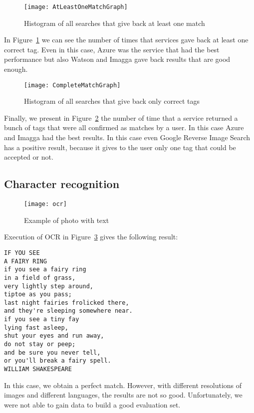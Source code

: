 \begin{figure}[H]
\centering
\texttt{[image: AtLeastOneMatchGraph]}
\caption{Histogram of all searches that give back at least one match}
\label{img:testatleastone}
\end{figure}

In Figure~\ref{img:testatleastone} we can see the number of times that services gave back at least one correct tag. Even in this case, Azure was the service that had the best performance but also Watson and Imagga gave back results that are good enough.

\begin{figure}[H]
\centering
\texttt{[image: CompleteMatchGraph]}
\caption{Histogram of all searches that give back only correct tags}
\label{img:testcompletematch}
\end{figure}

Finally, we present in Figure~\ref{img:testcompletematch} the number of time that a service returned a bunch of tags that were all confirmed as matches by a user. In this case Azure and Imagga had the best results. In this case even Google Reverse Image Search has a positive result, because it gives to the user only one tag that could be accepted or not.

\subsection{Character recognition}

\begin{figure}[H]
\centering
\texttt{[image: ocr]}
\caption{Example of photo with text}
\label{testOCR}
\end{figure}

Execution of OCR in Figure~\ref{testOCR} gives the following result:
\begin{lstlisting}
IF YOU SEE
A FAIRY RING
if you see a fairy ring
in a field of grass,
very lightly step around,
tiptoe as you pass;
last night fairies frolicked there,
and they're sleeping somewhere near.
if you see a tiny fay
lying fast asleep,
shut your eyes and run away,
do not stay or peep;
and be sure you never tell,
or you'll break a fairy spell.
WILLIAM SHAKESPEARE
\end{lstlisting}

In this case, we obtain a perfect match. However, with different resolutions of 
images and different languages, the results are not so good. Unfortunately, we 
were not able to gain data to build a good evaluation set.